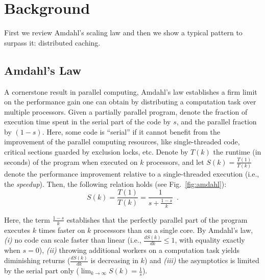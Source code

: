 \section{Background}\label{sec:background}

First we review Amdahl's scaling law and then we show a typical pattern to surpass it: distributed caching.

\subsection{Amdahl's Law}
\label{sec:amdahl-law}

A cornerstone result in parallel computing, Amdahl's law \cite{10.1145/1465482.1465560} establishes a firm limit on the performance gain one can obtain by distributing a computation task over multiple processors. Given a partially parallel program, denote the fraction of execution time spent %
in the serial part of the code by $s$, and the parallel fraction by $(1-s)$. Here, some code is ``serial'' if it cannot benefit from the improvement of the parallel computing resources, like single-threaded code, critical sections guarded by exclusion locks, etc. Denote by $T(k)$ the runtime (in seconds) of the program when executed on $k$ processors, and let $S(k)=\frac{T(1)}{T(k)}$ denote the performance improvement relative to a single-threaded execution (i.e., the \emph{speedup}). Then, the following relation holds (see Fig.~\ref{fig:amdahl}):
\begin{equation}\label{eq:amdahl}
S(k) = \frac{T(1)}{T(k)} = \frac{1}{s + \frac{1-s}{k}} \enspace .
\end{equation}

Here, the term $\frac{1-s}{k}$ establishes that the perfectly parallel part of the program executes $k$ times faster on $k$ processors than on a single core. By Amdahl's law, \emph{(i)} no code can scale faster than linear (i.e., $\frac{d S(k)}{d k} \le 1$, with equality exactly when $s=0$), \emph{(ii)} throwing additional workers on a computation task yields diminishing returns ($\frac{d S(k)}{d k}$ is decreasing in $k$) and \emph{(iii)} the asymptotics is limited by the serial part only ($\lim_{k\to \infty}S(k) = \frac1{s}$). 


